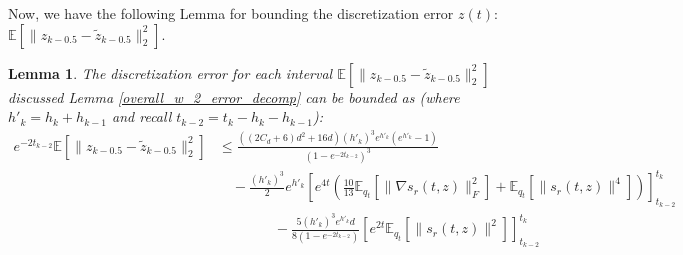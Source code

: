 \documentclass{article}
\newtheorem{lemma}{Lemma}[section]
\begin{document}
\noindent
Now, we have the following Lemma for bounding the discretization error $z(t)$: $\mathbb{E}\left[\|z_{k-0.5}-\tilde{z}_{k-0.5}\|_2^2\right]$. 
\begin{lemma}
\label{final_discretization_error_bound}
    The discretization error for each interval $\mathbb{E}\left[\|z_{k-0.5}-\tilde{z}_{k-0.5}\|_2^2\right]$ discussed Lemma \ref{overall_w_2_error_decomp} can be bounded as (where $h'_k=h_k+h_{k-1}$ and recall $t_{k-2}=t_k-h_{k}-h_{k-1}$):
    \begin{align*}
       e^{-2t_{k-2}} \mathbb{E}\left[\|z_{k-0.5}-\tilde{z}_{k-0.5}\|_2^2\right] &\leq \frac{\left((2C_d+6)d^2 +16d\right)(h'_k)^3e^{h'_k}(e^{h'_k}-1)}{(1-e^{-2t_{k-2}})^3} \\
         &\quad -\frac{(h'_k)^3}{2}e^{h'_k}\left[e^{4t}\left(\frac{10}{13}\mathbb{E}_{q_t}\left[\|\nabla s_r(t,z)\|_F^2\right] +\mathbb{E}_{q_t}[\|s_r(t,z)\|^4] \right) \right]^{t_k}_{t_{k-2}}\\
        &\qquad \qquad - \frac{5(h'_k)^3e^{h'_k}d}{8(1-e^{-2t_{k-2}})} \left[ {e^{2t}}\mathbb{E}_{q_t}[\|s_r(t,z)\|^2] \right]^{t_k}_{t_{k-2}}
    \end{align*}
    \end{lemma}
\end{document}
